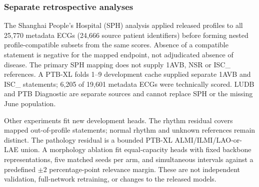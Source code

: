 \subsubsection{Separate retrospective analyses}
\label{sec:retrospective-methods}

The Shanghai People's Hospital (SPH) analysis applied released profiles to all 25,770 metadata ECGs (24,666 source patient identifiers) before forming nested profile-compatible subsets from the same scores. Absence of a compatible statement is negative for the mapped endpoint, not adjudicated absence of disease. The primary SPH mapping does not supply 1AVB, NSR or ISC\_ references. A PTB-XL folds 1--9 development cache supplied separate 1AVB and ISC\_ statements; 6,205 of 19,601 metadata ECGs were technically scored. LUDB and PTB Diagnostic are separate sources and cannot replace SPH or the missing June population.

Other experiments fit new development heads. The rhythm residual covers mapped out-of-profile statements; normal rhythm and unknown references remain distinct. The pathology residual is a bounded PTB-XL ALMI/ILMI/LAO-or-LAE union. A morphology ablation fit equal-capacity heads with fixed backbone representations, five matched seeds per arm, and simultaneous intervals against a predefined $\pm2$ percentage-point relevance margin. These are not independent validation, full-network retraining, or changes to the released models.
